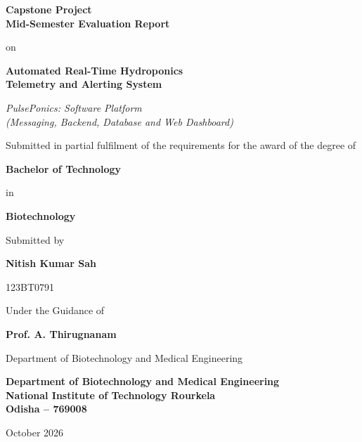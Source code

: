 \documentclass[11pt,a4paper,oneside]{report}
\begin{document}
\begin{titlepage}
\centering
\vspace*{0.4cm}
{\Large\bfseries Capstone Project\\[2pt] Mid-Semester Evaluation Report\par}
\vspace{0.6cm}
{\large on\par}
\vspace{0.6cm}
{\LARGE\bfseries Automated Real-Time Hydroponics\\[4pt] Telemetry and Alerting System\par}
\vspace{0.35cm}
{\large\itshape PulsePonics: Software Platform\\(Messaging, Backend, Database and Web Dashboard)\par}
\vspace{1.1cm}
{\normalsize Submitted in partial fulfilment of the requirements for the award of the degree of\par}
\vspace{0.3cm}
{\large\bfseries Bachelor of Technology\par}
{\normalsize in\par}
{\large\bfseries Biotechnology\par}
\vspace{1.1cm}
{\normalsize Submitted by\par}
\vspace{0.2cm}
{\large\bfseries Nitish Kumar Sah\par}
{\normalsize 123BT0791\par}
\vspace{1.1cm}
{\normalsize Under the Guidance of\par}
\vspace{0.2cm}
{\large\bfseries Prof. A. Thirugnanam\par}
{\normalsize Department of Biotechnology and Medical Engineering\par}
\vfill
{\normalsize\bfseries Department of Biotechnology and Medical Engineering\\
National Institute of Technology Rourkela\\ Odisha -- 769008\par}
\vspace{0.3cm}
{\normalsize October 2026\par}
\end{titlepage}
\end{document}
